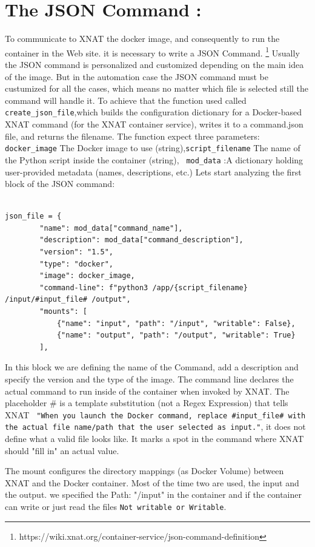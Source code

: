 \section{The JSON Command :}

To communicate to XNAT the docker image, and consequently to run the container in the Web site. it is necessary to write a JSON Command. 
\footnote{https://wiki.xnat.org/container-service/json-command-definition}
Usually the JSON command is personalized and customized depending on the main idea of the image. But in the automation case the JSON command must be custumized for all the cases, which means no matter which file is  selected still the command will handle it.
To achieve that the function used called \texttt{create\_json\_file},which builds the configuration dictionary for a Docker-based XNAT command (for the XNAT container service), writes it to a command.json file, and returns the filename.
The function expect three parameters:
\texttt{docker\_image} The Docker image to use (string),\texttt{script\_filename} The name of the Python script inside the container (string), \texttt{ mod\_data} :A dictionary holding user-provided metadata (names, descriptions, etc.)
Lets start analyzing the first block of the JSON command:
\begin{lstlisting}

json_file = {
        "name": mod_data["command_name"],
        "description": mod_data["command_description"],
        "version": "1.5",
        "type": "docker",
        "image": docker_image,
        "command-line": f"python3 /app/{script_filename} /input/#input_file# /output",
        "mounts": [
            {"name": "input", "path": "/input", "writable": False},
            {"name": "output", "path": "/output", "writable": True}
        ],
\end{lstlisting}


In this block we are  defining the name of the Command, add a description and specify the version and the type of the image.
The command line declares the actual command to run inside of the container when invoked by XNAT. The placeholder \# is a template substitution (not a Regex Expression)  that tells XNAT \texttt{ "When you launch the Docker command, replace \#input\_file\# with the actual file name/path that the user selected as input."}, it does not define what a valid file looks like. It marks a spot in the command where XNAT should "fill in" an actual value.

The mount configures the directory mappings (as Docker Volume) between XNAT and the Docker container. Most of the time two are used, the input and the output.
we specified the Path: "/input" in the container and if the container can write or just read the files  \texttt{Not writable or Writable}.

